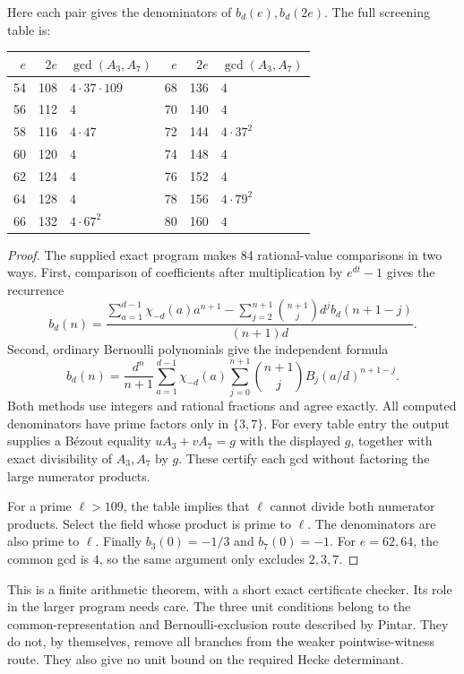 Here each pair gives the denominators of $b_d(e),b_d(2e)$.
The full screening table is:

\begin{center}
\begin{tabular}{@{}rrl@{\qquad}rrl@{}}
\toprule
$e$ & $2e$ & $\gcd(A_3,A_7)$ & $e$ & $2e$ & $\gcd(A_3,A_7)$\\
\midrule
54&108&$4\cdot37\cdot109$&68&136&$4$\\
56&112&$4$&70&140&$4$\\
58&116&$4\cdot47$&72&144&$4\cdot37^2$\\
60&120&$4$&74&148&$4$\\
62&124&$4$&76&152&$4$\\
64&128&$4$&78&156&$4\cdot79^2$\\
66&132&$4\cdot67^2$&80&160&$4$\\
\bottomrule
\end{tabular}
\end{center}

\begin{proof}
The supplied exact program makes 84 rational-value comparisons
in two ways. First, comparison of coefficients after multiplication
by $e^{dt}-1$ gives the recurrence
\[
 b_d(n)=
 \frac{\displaystyle
 \sum_{a=1}^{d-1}\chi_{-d}(a)a^{n+1}
 -\sum_{j=2}^{n+1}\binom{n+1}{j}d^j b_d(n+1-j)}
 {(n+1)d}.
\]
Second, ordinary Bernoulli polynomials give the independent formula
\[
 b_d(n)=\frac{d^n}{n+1}
 \sum_{a=1}^{d-1}\chi_{-d}(a)
 \sum_{j=0}^{n+1}\binom{n+1}{j}B_j(a/d)^{n+1-j}.
\]
Both methods use integers and rational fractions and agree exactly.
All computed denominators have prime factors only in $\{3,7\}$.
For every table entry the output supplies a B\'ezout equality
$uA_3+vA_7=g$ with the displayed $g$, together with exact divisibility
of $A_3,A_7$ by $g$. These certify each gcd without factoring the
large numerator products.

For a prime $\ell>109$, the table implies that $\ell$ cannot divide
both numerator products. Select the field whose product is prime
to $\ell$. The denominators are also prime to $\ell$.
Finally $b_3(0)=-1/3$ and $b_7(0)=-1$. For $e=62,64$, the common
gcd is $4$, so the same argument only excludes $2,3,7$.
\end{proof}

This is a finite arithmetic theorem, with a short exact certificate
checker. Its role in the larger program needs care. The three unit
conditions belong to the common-representation and Bernoulli-exclusion
route described by Pintar. They do not, by themselves, remove all
branches from the weaker pointwise-witness route. They also give no
unit bound on the required Hecke determinant.

